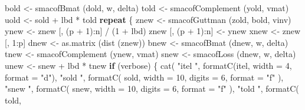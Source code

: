 \documentclass[
  12pt,
  letterpaper,
  DIV=11,
  numbers=noendperiod]{scrreprt}
\newenvironment{Shaded}{\begin{snugshade}}{\end{snugshade}}
\newcommand{\AttributeTok}[1]{\textcolor[rgb]{0.40,0.45,0.13}{#1}}
\newcommand{\ControlFlowTok}[1]{\textcolor[rgb]{0.00,0.23,0.31}{\textbf{#1}}}
\newcommand{\DecValTok}[1]{\textcolor[rgb]{0.68,0.00,0.00}{#1}}
\newcommand{\FunctionTok}[1]{\textcolor[rgb]{0.28,0.35,0.67}{#1}}
\newcommand{\NormalTok}[1]{\textcolor[rgb]{0.00,0.23,0.31}{#1}}
\newcommand{\OtherTok}[1]{\textcolor[rgb]{0.00,0.23,0.31}{#1}}
\newcommand{\SpecialCharTok}[1]{\textcolor[rgb]{0.37,0.37,0.37}{#1}}
\newcommand{\StringTok}[1]{\textcolor[rgb]{0.13,0.47,0.30}{#1}}
\theoremstyle{remark}
\begin{document}
\begin{Shaded}
\begin{Highlighting}[]
\NormalTok{    bold }\OtherTok{\textless{}{-}} \FunctionTok{smacofBmat}\NormalTok{ (dold, w, delta)}
\NormalTok{    told }\OtherTok{\textless{}{-}} \FunctionTok{smacofComplement}\NormalTok{ (yold, vmat)}
\NormalTok{    uold }\OtherTok{\textless{}{-}}\NormalTok{ sold }\SpecialCharTok{+}\NormalTok{ lbd }\SpecialCharTok{*}\NormalTok{ told}
    \ControlFlowTok{repeat}\NormalTok{ \{}
\NormalTok{      znew }\OtherTok{\textless{}{-}} \FunctionTok{smacofGuttman}\NormalTok{ (zold, bold, vinv)}
\NormalTok{      ynew }\OtherTok{\textless{}{-}}\NormalTok{ znew [, (p }\SpecialCharTok{+} \DecValTok{1}\NormalTok{)}\SpecialCharTok{:}\NormalTok{n] }\SpecialCharTok{/}\NormalTok{ (}\DecValTok{1} \SpecialCharTok{+}\NormalTok{ lbd)}
\NormalTok{      znew [, (p }\SpecialCharTok{+} \DecValTok{1}\NormalTok{)}\SpecialCharTok{:}\NormalTok{n] }\OtherTok{\textless{}{-}}\NormalTok{ ynew}
\NormalTok{      xnew }\OtherTok{\textless{}{-}}\NormalTok{ znew [, }\DecValTok{1}\SpecialCharTok{:}\NormalTok{p]}
\NormalTok{      dnew }\OtherTok{\textless{}{-}} \FunctionTok{as.matrix}\NormalTok{ (}\FunctionTok{dist}\NormalTok{ (znew))}
\NormalTok{      bnew }\OtherTok{\textless{}{-}} \FunctionTok{smacofBmat}\NormalTok{ (dnew, w, delta)}
\NormalTok{      tnew }\OtherTok{\textless{}{-}} \FunctionTok{smacofComplement}\NormalTok{ (ynew, vmat)}
\NormalTok{      snew }\OtherTok{\textless{}{-}} \FunctionTok{smacofLoss}\NormalTok{ (dnew, w, delta)}
\NormalTok{      unew }\OtherTok{\textless{}{-}}\NormalTok{ snew }\SpecialCharTok{+}\NormalTok{ lbd }\SpecialCharTok{*}\NormalTok{ tnew}
      \ControlFlowTok{if}\NormalTok{ (verbose) \{}
        \FunctionTok{cat}\NormalTok{(}
          \StringTok{"itel "}\NormalTok{,}
          \FunctionTok{formatC}\NormalTok{(itel, }\AttributeTok{width =} \DecValTok{4}\NormalTok{, }\AttributeTok{format =} \StringTok{"d"}\NormalTok{),}
          \StringTok{"sold "}\NormalTok{,}
          \FunctionTok{formatC}\NormalTok{(}
\NormalTok{            sold,}
            \AttributeTok{width =} \DecValTok{10}\NormalTok{,}
            \AttributeTok{digits =} \DecValTok{6}\NormalTok{,}
            \AttributeTok{format =} \StringTok{"f"}
\NormalTok{          ),}
          \StringTok{"snew "}\NormalTok{,}
          \FunctionTok{formatC}\NormalTok{(}
\NormalTok{            snew,}
            \AttributeTok{width =} \DecValTok{10}\NormalTok{,}
            \AttributeTok{digits =} \DecValTok{6}\NormalTok{,}
            \AttributeTok{format =} \StringTok{"f"}
\NormalTok{          ),}
          \StringTok{"told "}\NormalTok{,}
          \FunctionTok{formatC}\NormalTok{(}
\NormalTok{            told,}

\end{Highlighting}
\end{Shaded}
\end{document}
